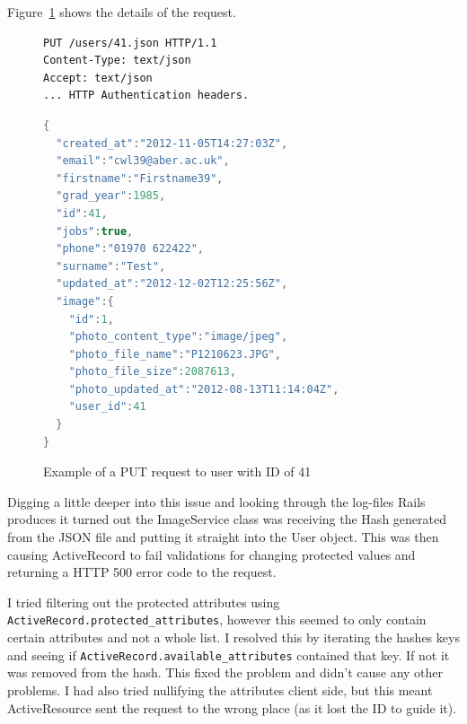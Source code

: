 \documentclass{article}
\begin{document}
Figure~\ref{fig:activeresource-to-activerrecord-500} shows the details of the request.

\begin{figure}[h]
\begin{verbatim}
PUT /users/41.json HTTP/1.1
Content-Type: text/json
Accept: text/json
... HTTP Authentication headers.
\end{verbatim}
\begin{lstlisting}[language=java]
{
  "created_at":"2012-11-05T14:27:03Z",
  "email":"cwl39@aber.ac.uk",
  "firstname":"Firstname39",
  "grad_year":1985,
  "id":41,
  "jobs":true,
  "phone":"01970 622422",
  "surname":"Test",
  "updated_at":"2012-12-02T12:25:56Z",
  "image":{
    "id":1,
    "photo_content_type":"image/jpeg",
    "photo_file_name":"P1210623.JPG",
    "photo_file_size":2087613,
    "photo_updated_at":"2012-08-13T11:14:04Z",
    "user_id":41
  }
}
\end{lstlisting}
\caption{Example of a PUT request to user with ID of 41}
\label{fig:activeresource-to-activerrecord-500}
\end{figure}

Digging a little deeper into this issue and looking through the log-files Rails produces
it turned out the ImageService class was receiving the Hash generated from the JSON file
and putting it straight into the User object. This was then causing ActiveRecord to fail
validations for changing protected values and returning a HTTP 500 error code to the 
request.

I tried filtering out the protected attributes using 
\verb$ActiveRecord.protected_attributes$, however this seemed to only contain certain 
attributes and not a whole list. I resolved this by iterating the hashes keys and seeing 
if \verb$ActiveRecord.available_attributes$ contained that key. If not it was removed 
from the hash. This fixed the problem and didn't cause any other problems. I had also 
tried nullifying the attributes client side, but this meant ActiveResource sent the 
request to the wrong place (as it lost the ID to guide it).

\clearpage


\end{document}
